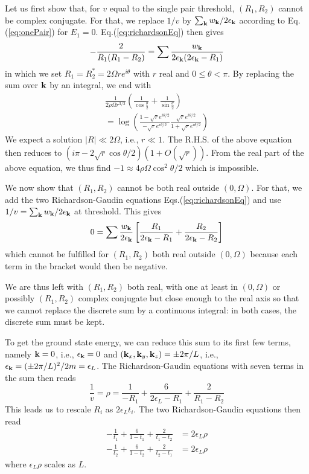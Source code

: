 \documentclass[5p,twocolumn]{elsarticle}
\begin{document}
Let us first show that, for $v$ equal to the single pair threshold, $(R_1,R_2)$ cannot be complex conjugate. For that, we replace $1/v$ by $\sum_{\mathbf{k}}w_{\mathbf{k}}/2\epsilon_{\mathbf{k}}$ according to Eq.(\ref{eq:onePair}) for $E_1=0$. Eq.(\ref{eq:richardsonEq}) then gives
\begin{equation}
-\frac{2}{R_{1}(R_{1}-R_{2})}=\sum\frac{w_{\mathbf{k}}}{2\epsilon_{\mathbf{k}}(2\epsilon_{\mathbf{k}}-R_{1})}
\end{equation}
in which we set $R_1=R^*_2=2 \Omega r e^{i\theta}$ with $r$ real and $0\leqslant\theta<\pi$. By replacing the sum over $\mathbf{k}$ by an integral, we end with
\begin{multline}
\frac{1}{2\rho\Omega{r^{3/2}}}\left(\frac{1}{\cos\frac{\theta}{2}}+\frac{1}{\sin\frac{\theta}{2}}\right)\\
=\log\left(\frac{1-\sqrt{r}e^{i\theta/2}}{-\sqrt{r}e^{i\theta/2}}\frac{\sqrt{r}e^{i\theta/2}}{1+\sqrt{r}e^{i\theta/2}}\right)
\end{multline}
We expect a solution $|R|\ll2 \Omega$, i.e., $r\ll1$. The R.H.S. of the above equation then reduces to 
$(i\pi-2\sqrt r\cos\theta/2)(1+O(\sqrt r))$. From the real part of the above equation, we thus find $-1\approx4 \rho \Omega\cos^2\theta/2$ which is impossible.


We now show that $(R_1,R_2)$ cannot be both real outside $(0,\Omega)$. For that, we add the two Richardson-Gaudin equations Eqs.(\ref{eq:richardsonEq}) and use $1/v=\sum_{\mathbf{k}}w_{\mathbf{k}}/2\epsilon_{\mathbf{k}}$ at threshold. This gives
\begin{equation}
0=\sum\frac{w_{\mathbf{k}}}{2\epsilon_{\mathbf{k}}}\left[\frac{R_{1}}{2\epsilon_{\mathbf{k}}-R_{1}}+\frac{R_{2}}{2\epsilon_{\mathbf{k}}-R_{2}}\right]
\end{equation}
which cannot be fulfilled for $(R_1,R_2)$ both real outside $(0,\Omega)$ because each term in the bracket would then be negative.


We are thus left with $(R_1,R_2)$ both real, with one at least in $(0,\Omega)$ or possibly $(R_1,R_2)$ complex conjugate but close enough to the real axis so that we cannot replace the discrete sum by a continuous integral: in both cases, the discrete sum must be kept. 

To get the ground state energy, we can reduce this sum to its first few terms, namely $\mathbf{k}=0$, i.e., $\epsilon_{\mathbf{k}}=0$ and
 $(\mathbf{k}_x,\mathbf{k}_y,\mathbf{k}_z)=\pm 2\pi/L
 $, i.e., $\epsilon_{\mathbf{k}}=(\pm 2\pi/L)^2/2m=\epsilon_L$. The Richardson-Gaudin equations with seven terms in the sum then reads
\begin{equation}
\frac{1}{v}=\rho=\frac{1}{-R_{1}}+\frac{6}{2\epsilon_{L}-R_{1}}+\frac{2}{R_{1}-R_{2}}
\end{equation}
This leads us to rescale $R_i$ as $2\epsilon_L t_i$. The two Richardson-Gaudin equations then read
\begin{equation}
\begin{split}
-\frac{1}{t_{1}}+\frac{6}{1-t_{1}}+\frac{2}{t_{1}-t_{2}}&=2\epsilon_{L}\rho\\
-\frac{1}{t_{2}}+\frac{6}{1-t_{2}}+\frac{2}{t_{2}-t_{1}}&=2\epsilon_{L}\rho
\end{split}\label{eq:t12}
\end{equation}
where $\epsilon_L\rho$ scales as $L$.
\end{document}
